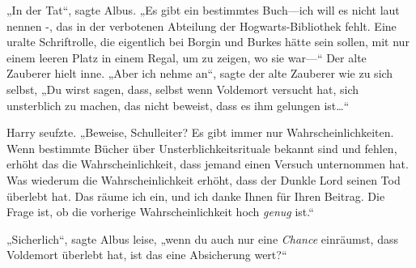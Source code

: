 „In der Tat“, sagte Albus. „Es gibt ein bestimmtes Buch—ich will es nicht laut nennen -, das in der verbotenen Abteilung der Hogwarts-Bibliothek fehlt. Eine uralte Schriftrolle, die eigentlich bei Borgin und Burkes hätte sein sollen, mit nur einem leeren Platz in einem Regal, um zu zeigen, wo sie war—“ Der alte Zauberer hielt inne. „Aber ich nehme an“, sagte der alte Zauberer wie zu sich selbst, „Du wirst sagen, dass, selbst wenn Voldemort versucht hat, sich unsterblich zu machen, das nicht beweist, dass es ihm gelungen ist…“

Harry seufzte. „Beweise, Schulleiter? Es gibt immer nur Wahrscheinlichkeiten. Wenn bestimmte Bücher über Unsterblichkeitsrituale bekannt sind und fehlen, erhöht das die Wahrscheinlichkeit, dass jemand einen Versuch unternommen hat. Was wiederum die Wahrscheinlichkeit erhöht, dass der Dunkle Lord seinen Tod überlebt hat. Das räume ich ein, und ich danke Ihnen für Ihren Beitrag. Die Frage ist, ob die vorherige Wahrscheinlichkeit hoch \emph{genug} ist.“

„Sicherlich“, sagte Albus leise, „wenn du auch nur eine \emph{Chance} einräumst, dass Voldemort überlebt hat, ist das eine Absicherung wert?“

